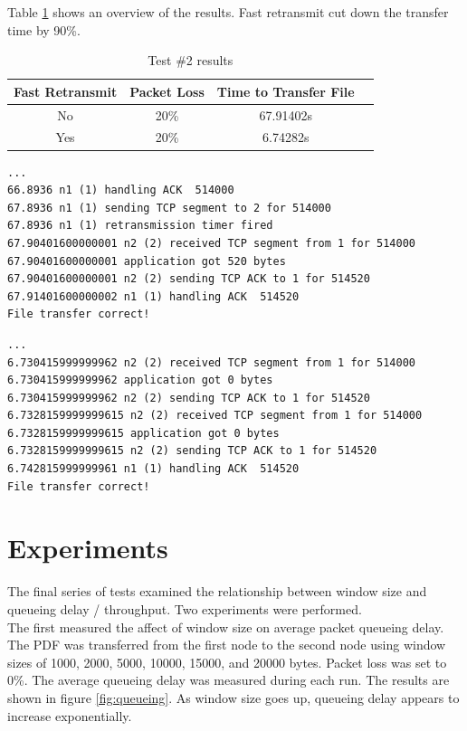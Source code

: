 \documentclass[fleqn,11pt]{article}
\begin{document}
Table \ref{tab:fast} shows an overview of the results. Fast retransmit cut down
the transfer time by 90\%.

\begin{table}[h]
  \caption{Test \#2 results}
  \label{tab:fast}
  \begin{center}
    \begin{tabular}{cccc}
      \toprule Fast Retransmit & Packet Loss & Time to Transfer File \\
      \midrule
      No & 20\% & 67.91402s \\
      Yes & 20\% & 6.74282s \\
      \bottomrule
    \end{tabular}
  \end{center}
\end{table}

\begin{lstlisting}[caption={Truncated output for no fast retransmit}]
...
66.8936 n1 (1) handling ACK  514000
67.8936 n1 (1) sending TCP segment to 2 for 514000
67.8936 n1 (1) retransmission timer fired
67.90401600000001 n2 (2) received TCP segment from 1 for 514000
67.90401600000001 application got 520 bytes
67.90401600000001 n2 (2) sending TCP ACK to 1 for 514520
67.91401600000002 n1 (1) handling ACK  514520
File transfer correct!
\end{lstlisting}

\newpage

\begin{lstlisting}[caption={Truncated output for fast retransmit}]
...
6.730415999999962 n2 (2) received TCP segment from 1 for 514000
6.730415999999962 application got 0 bytes
6.730415999999962 n2 (2) sending TCP ACK to 1 for 514520
6.7328159999999615 n2 (2) received TCP segment from 1 for 514000
6.7328159999999615 application got 0 bytes
6.7328159999999615 n2 (2) sending TCP ACK to 1 for 514520
6.742815999999961 n1 (1) handling ACK  514520
File transfer correct!
\end{lstlisting}

\section{Experiments}

\indent\indent The final series of tests examined the relationship between
window size and queueing delay / throughput. Two experiments were performed.\\

The first measured the affect of window size on average packet queueing delay.
The PDF was transferred from the first node to the second node using window
sizes of 1000, 2000, 5000, 10000, 15000, and 20000 bytes. Packet loss was set
to 0\%. The average queueing delay was measured during each run. The results
are shown in figure \ref{fig:queueing}. As window size goes up, queueing delay appears
to increase exponentially. \\
\end{document}
